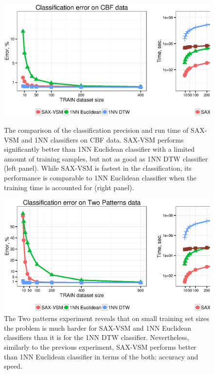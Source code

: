 \begin{figure}[t]
   \centering
   \includegraphics[width=140mm]{figures/cbf-precision-runtime.ps}
   \caption{The comparison of the classification precision and run time of SAX-VSM and 1NN 
   classifiers on CBF data. SAX-VSM performs significantly better than 1NN Euclidean classifier with 
   a limited amount of training samples, but not as good as 1NN DTW classifier (left panel). 
   While SAX-VSM is fastest in the classification, its performance is comparable to 1NN Euclidean classifier 
   when the training time is accounted for (right panel).}
   \label{fig:precision-runtime}

   \includegraphics[width=140mm]{figures/2patterns-precision-runtime.ps}
   \caption{The Two patterns experiment reveals that on small training set sizes the problem is much harder 
   for SAX-VSM and 1NN Euclidean classifiers than it is for the 1NN DTW classifier. 
   Nevertheless, similarly to the previous experiment, SAX-VSM performs better than 1NN Euclidean classifier
   in terms of the both: accuracy and speed.}
   \label{fig:2p-precision-runtime}
\end{figure}

